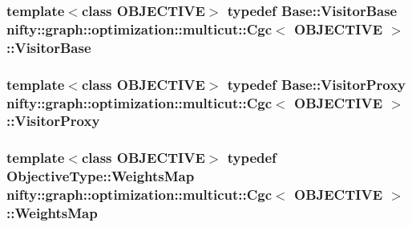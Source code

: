 \subsubsection[{Visitor\+Base}]{\setlength{\rightskip}{0pt plus 5cm}template$<$class O\+B\+J\+E\+C\+T\+I\+V\+E$>$ typedef {\bf Base\+::\+Visitor\+Base} {\bf nifty\+::graph\+::optimization\+::multicut\+::\+Cgc}$<$ O\+B\+J\+E\+C\+T\+I\+V\+E $>$\+::{\bf Visitor\+Base}}\label{classnifty_1_1graph_1_1optimization_1_1multicut_1_1Cgc_afb4bc97ca8d80719f67fe59823ac9466}
\hypertarget{classnifty_1_1graph_1_1optimization_1_1multicut_1_1Cgc_abcca194a80764ede21e22a9a9dbbddc4}{}
\subsubsection[{Visitor\+Proxy}]{\setlength{\rightskip}{0pt plus 5cm}template$<$class O\+B\+J\+E\+C\+T\+I\+V\+E$>$ typedef {\bf Base\+::\+Visitor\+Proxy} {\bf nifty\+::graph\+::optimization\+::multicut\+::\+Cgc}$<$ O\+B\+J\+E\+C\+T\+I\+V\+E $>$\+::{\bf Visitor\+Proxy}}\label{classnifty_1_1graph_1_1optimization_1_1multicut_1_1Cgc_abcca194a80764ede21e22a9a9dbbddc4}
\hypertarget{classnifty_1_1graph_1_1optimization_1_1multicut_1_1Cgc_a6d3ba8605fd7c111fca7a9f79ca09c32}{}
\subsubsection[{Weights\+Map}]{\setlength{\rightskip}{0pt plus 5cm}template$<$class O\+B\+J\+E\+C\+T\+I\+V\+E$>$ typedef Objective\+Type\+::\+Weights\+Map {\bf nifty\+::graph\+::optimization\+::multicut\+::\+Cgc}$<$ O\+B\+J\+E\+C\+T\+I\+V\+E $>$\+::{\bf Weights\+Map}}\label{classnifty_1_1graph_1_1optimization_1_1multicut_1_1Cgc_a6d3ba8605fd7c111fca7a9f79ca09c32}
\hypertarget{classnifty_1_1graph_1_1optimization_1_1multicut_1_1Cgc_ac8f7c1da4b33561e45fe423f2c12b2b5}{}
